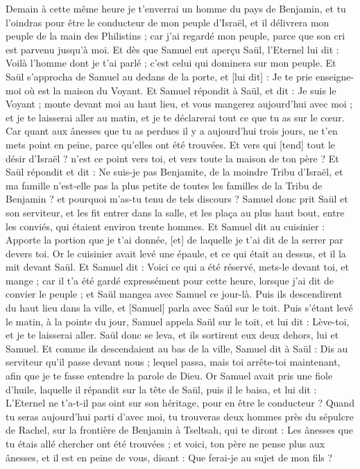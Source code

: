 \begin{multicols}{2}
Demain à cette même heure je t'enverrai un homme du pays de Benjamin, et tu l'oindras pour être le conducteur de mon peuple d'Israël, et il délivrera mon peuple de la main des Philistins ; car j'ai regardé mon peuple, parce que son cri est parvenu jusqu'à moi.
Et dès que Samuel eut aperçu Saül, l'Eternel lui dit : Voilà l'homme dont je t'ai parlé ; c'est celui qui dominera sur mon peuple.
Et Saül s'approcha de Samuel au dedans de la porte, et [lui dit] : Je te prie enseigne-moi où est la maison du Voyant.
Et Samuel répondit à Saül, et dit : Je suis le Voyant ; monte devant moi au haut lieu, et vous mangerez aujourd'hui avec moi ; et je te laisserai aller au matin, et je te déclarerai tout ce que tu as sur le cœur.
Car quant aux ânesses que tu as perdues il y a aujourd'hui trois jours, ne t'en mets point en peine, parce qu'elles ont été trouvées. Et vers qui [tend] tout le désir d'Israël ? n'est ce point vers toi, et vers toute la maison de ton père ?
Et Saül répondit et dit : Ne suis-je pas Benjamite, de la moindre Tribu d'Israël, et ma famille n'est-elle pas la plus petite de toutes les familles de la Tribu de Benjamin ? et pourquoi m'as-tu tenu de tels discours ?
Samuel donc prit Saül et son serviteur, et les fit entrer dans la salle, et les plaça au plus haut bout, entre les conviés, qui étaient environ trente hommes.
Et Samuel dit au cuisinier : Apporte la portion que je t'ai donnée, [et] de laquelle je t'ai dit de la serrer par devers toi.
Or le cuisinier avait levé une épaule, et ce qui était au dessus, et il la mit devant Saül. Et Samuel dit : Voici ce qui a été réservé, mets-le devant toi, et mange ; car il t'a été gardé expressément pour cette heure, lorsque j'ai dit de convier le peuple ; et Saül mangea avec Samuel ce jour-là.
Puis ils descendirent du haut lieu dans la ville, et [Samuel] parla avec Saül sur le toit.
Puis s'étant levé le matin, à la pointe du jour, Samuel appela Saül sur le toit, et lui dit : Lève-toi, et je te laisserai aller. Saül donc se leva, et ils sortirent eux deux dehors, lui et Samuel.
Et comme ils descendaient au bas de la ville, Samuel dit à Saül : Dis au serviteur qu'il passe devant nous ; lequel passa, mais toi arrête-toi maintenant, afin que je te fasse entendre la parole de Dieu.
\VerseOne{}Or Samuel avait pris une fiole d'huile, laquelle il répandit sur la tête de Saül, puis il le baisa, et lui dit : L'Eternel ne t'a-t-il pas oint sur son héritage, pour en être le conducteur ?
Quand tu seras aujourd'hui parti d'avec moi, tu trouveras deux hommes près du sépulcre de Rachel, sur la frontière de Benjamin à Tseltsah, qui te diront : Les ânesses que tu étais allé chercher ont été trouvées ; et voici, ton père ne pense plus aux ânesses, et il est en peine de vous, disant : Que ferai-je au sujet de mon fils ?

\end{multicols}

